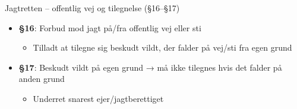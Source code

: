 \begin{frame}{Jagtretten – offentlig vej og tilegnelse (§16–§17)}
    \begin{itemize}
        \item \textbf{§16}: Forbud mod jagt på/fra offentlig vej eller sti
          \begin{itemize}
            \item Tilladt at tilegne sig beskudt vildt, der falder på vej/sti fra egen grund
          \end{itemize}
        \item \textbf{§17}: Beskudt vildt på egen grund → må ikke tilegnes hvis det falder på anden grund
          \begin{itemize}
            \item Underret snarest ejer/jagtberettiget
          \end{itemize}
    \end{itemize}
\end{frame}